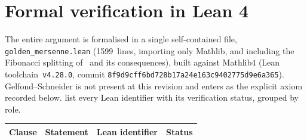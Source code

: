 \section{Formal verification in Lean 4}

The entire argument is formalised in a single self-contained file,
\texttt{golden\_mersenne.lean} (1599~lines, importing
only Mathlib, and including the Fibonacci splitting of~
and its consequences), built against Mathlib4 (Lean toolchain~\texttt{v4.28.0}, commit
\texttt{8f9d9cff6bd728b17a24e163c9402775d9e6a365}).  Gelfond--Schneider
is not present at this revision and enters as the explicit axiom
recorded below.   list every Lean identifier
with its verification status, grouped by role.

\begin{table}[p]\centering\footnotesize
\setlength{\tabcolsep}{4pt}
\begin{tabular}{@{}p{1.0cm}p{3.6cm}p{5.0cm}p{1.5cm}@{}}
\toprule
Clause & Statement & Lean identifier & Status \\
\midrule


\end{tabular}
\end{table}
